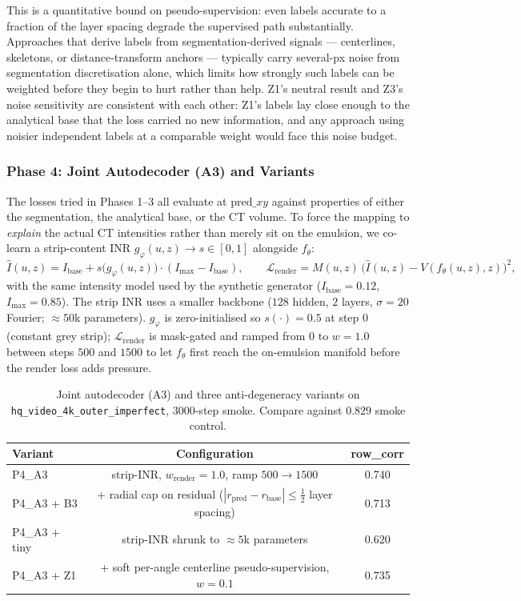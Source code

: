\documentclass[11pt,a4paper]{article}
\begin{document}
This is a quantitative bound on pseudo-supervision: even labels accurate to a fraction of the layer spacing degrade the supervised path substantially. Approaches that derive labels from segmentation-derived signals — centerlines, skeletons, or distance-transform anchors — typically carry several-px noise from segmentation discretisation alone, which limits how strongly such labels can be weighted before they begin to hurt rather than help. Z1's neutral result and Z3's noise sensitivity are consistent with each other: Z1's labels lay close enough to the analytical base that the loss carried no new information, and any approach using noisier independent labels at a comparable weight would face this noise budget.

\subsubsection{Phase 4: Joint Autodecoder (A3) and Variants}
\label{sec:phase4_a3}

The losses tried in Phases 1--3 all evaluate at $\mathrm{pred}\_xy$ against properties of either the segmentation, the analytical base, or the CT volume. To force the mapping to \emph{explain} the actual CT intensities rather than merely sit on the emulsion, we co-learn a strip-content INR $g_\varphi(u, z) \to s \in [0, 1]$ alongside $f_\theta$:
\begin{equation}
\hat I(u, z) = I_{\mathrm{base}} + s\bigl(g_\varphi(u, z)\bigr)\cdot (I_{\max} - I_{\mathrm{base}}),
\qquad
\mathcal{L}_{\mathrm{render}} = M(u, z)\,\bigl(\hat I(u, z) - V(f_\theta(u, z), z)\bigr)^2,
\end{equation}
with the same intensity model used by the synthetic generator ($I_{\mathrm{base}} = 0.12$, $I_{\max} = 0.85$). The strip INR uses a smaller backbone ($128$ hidden, $2$ layers, $\sigma = 20$ Fourier; $\approx 50$k parameters). $g_\varphi$ is zero-initialised so $s(\cdot) = 0.5$ at step $0$ (constant grey strip); $\mathcal{L}_{\mathrm{render}}$ is mask-gated and ramped from $0$ to $w = 1.0$ between steps $500$ and $1500$ to let $f_\theta$ first reach the on-emulsion manifold before the render loss adds pressure.

\begin{table}[H]
\centering
\small
\begin{tabular}{lcc}
\toprule
Variant & Configuration & row\_corr \\
\midrule
P4\_A3        & strip-INR, $w_{\mathrm{render}} = 1.0$, ramp $500 \to 1500$ & 0.740 \\
P4\_A3 + B3   & + radial cap on residual ($|r_{\mathrm{pred}} - r_{\mathrm{base}}| \le \tfrac{1}{2}$ layer spacing) & 0.713 \\
P4\_A3 + tiny & strip-INR shrunk to $\approx 5$k parameters & 0.620 \\
P4\_A3 + Z1   & + soft per-angle centerline pseudo-supervision, $w = 0.1$ & 0.735 \\
\bottomrule
\end{tabular}
\caption{Joint autodecoder (A3) and three anti-degeneracy variants on \texttt{hq\_video\_4k\_outer\_imperfect}, $3000$-step smoke. Compare against $0.829$ smoke control.}
\label{tab:phase4_a3}
\end{table}
\end{document}
